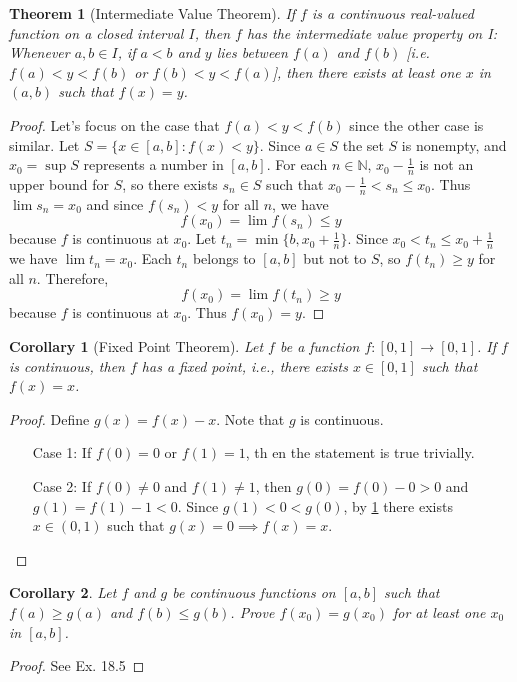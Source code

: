 \documentclass[12pt, lettersize]{book}
\theoremstyle{plain}
\newtheorem{thm}{Theorem}[section]
\newtheorem{cor}{Corollary}[thm]
\theoremstyle{definition}
\theoremstyle{remark}
\newcommand{\N}{\mathbb{N}}
\begin{document}
			\begin{thm}[Intermediate Value Theorem]\label{thm:18.2}
			If $f$ is a continuous real-valued function on a closed interval $I$, then $f$ has the intermediate value property on I: Whenever $a,b\in I$, if $a<b$ and $y$ lies between $f(a)$ and $f(b)$ [i.e. $f(a)<y<f(b)$ or $f(b)<y<f(a)$], then there exists at least one $x$ in
			$(a,b)$ such that $f(x)=y$.
			\end{thm}
			\begin{proof}
			Let's focus on the case that $f(a)<y<f(b)$ since the other case is similar. Let $S=\{x\in[a,b]: f(x)<y\}$. Since
			$a\in S$ the set $S$ is nonempty, and $x_0=\sup S$ represents a number in $[a,b]$. For each $n\in\N$, $x_0-\frac{1}{n}$ is not an upper bound for $S$, so there exists $s_n\in S$ such that $x_0-\frac{1}{n}<s_n\leq x_0$. Thus $\lim s_n=x_0$ and since $f(s_n)<y$ for all $n$, we have 
			\begin{displaymath}
				f(x_0)=\lim f(s_n)\leq y
			\end{displaymath} 
			because $f$ is continuous at $x_0$. Let $t_n=\min\{b, x_0+\frac{1}{n}\}$. Since $x_0<t_n\leq x_0+\frac{1}{n}$ we have $\lim t_n=x_0$. Each $t_n$ belongs to $[a,b]$ but not to $S$, so $f(t_n)\geq y$ for all $n$. Therefore,
			\begin{displaymath}
				f(x_0)=\lim f(t_n)\geq y
			\end{displaymath}
			because $f$ is continuous at $x_0$. Thus $f(x_0)=y$. 
			\end{proof}
			\begin{cor}[Fixed Point Theorem]
			Let $f$ be a function $f:[0,1]\rightarrow[0,1]$. If $f$ is continuous, then $f$ has a fixed point, i.e., there exists $x\in[0,1]$ such that $f(x)=x$.
			\end{cor}
			\begin{proof}
			Define $g(x)=f(x)-x$. Note that $g$ is continuous.
			\begin{itemize}
				\item[Case 1:] If $f(0)=0$ or $f(1)=1$, th en the statement is true trivially.
				\item[Case 2:] If $f(0)\neq0$ and $f(1)\neq1$, then $g(0)=f(0)-0>0$ and $g(1)=f(1)-1<0$. Since $g(1)<0<g(0)$, by \ref{thm:18.2} there exists $x\in(0,1)$ such that $g(x)=0\implies f(x)=x$.
			\end{itemize}
			\end{proof}
			\begin{cor}
			Let $f$ and $g$ be continuous functions on $[a,b]$ such that $f(a)\geq g(a)$ and $f(b)\leq g(b)$. Prove $f(x_0)=g(x_0)$ for at least one $x_0$ in $[a,b]$.
			\end{cor}
			\begin{proof}
				See Ex. 18.5
			\end{proof}
			
\end{document}
